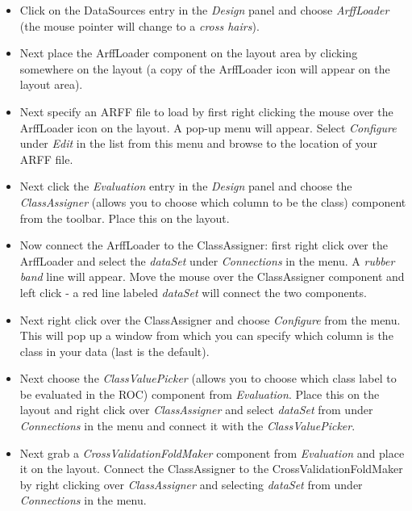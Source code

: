 \begin{itemize}
	\item Click on the DataSources entry in the \textit{Design}
          panel and choose \textit{ArffLoader} (the mouse pointer will
          change to a \textit{cross hairs}).

	\item Next place the ArffLoader component on the layout area by clicking
	somewhere on the layout (a copy of the ArffLoader icon will appear on
	the layout area).

	\item Next specify an ARFF file to load by first right clicking the mouse
	over the ArffLoader icon on the layout. A pop-up menu will
	appear. Select \textit{Configure} under \textit{Edit} in the list from this menu and
	browse to the location of your ARFF file.

	\item Next click the \textit{Evaluation} entry in the
          \textit{Design} panel and choose the \textit{ClassAssigner}
          (allows you to choose which column to be the class)
          component from the toolbar. Place this on the layout.

	\item Now connect the ArffLoader to the ClassAssigner: first right click
	over the ArffLoader and select the \textit{dataSet} under \textit{Connections} in
	the menu. A \textit{rubber band} line will appear. Move the mouse over the
	ClassAssigner component and left click - a red line labeled \textit{dataSet}
	will connect the two components.

	\item Next right click over the ClassAssigner and choose \textit{Configure} from
	the menu. This will pop up a window from which you can specify which
	column is the class in your data (last is the default).

	\item Next choose the \textit{ClassValuePicker} (allows you to
          choose which class label to be evaluated in the ROC)
          component from \textit{Evaluation}. Place this on
          the layout and right click over \textit{ClassAssigner} and
          select \textit{dataSet} from under \textit{Connections} in
          the menu and connect it with the \textit{ClassValuePicker}.

	\item Next grab a \textit{CrossValidationFoldMaker} component
          from \textit{Evaluation} and place it on the layout. Connect
          the ClassAssigner to the CrossValidationFoldMaker by right
          clicking over \textit{ClassAssigner} and selecting
          \textit{dataSet} from under \textit{Connections} in the
          menu.


\end{itemize}
